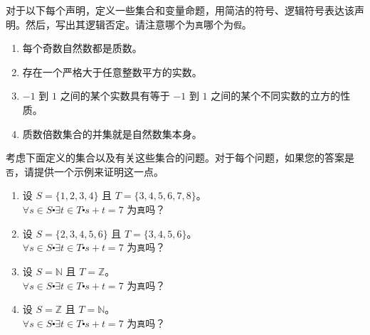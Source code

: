 \begin{exercise}
    对于以下每个声明，定义一些集合和变量命题，用简洁的符号、逻辑符号表达该声明。然后，写出其逻辑否定。请注意哪个为\verb|真|哪个为\verb|假|。

    \begin{enumerate}[label=(\alph*)]
        \item 每个奇数自然数都是质数。
        \item 存在一个严格大于任意整数平方的实数。
        \item $-1$ 到 $1$ 之间的某个实数具有等于 $-1$ 到 $1$ 之间的某个不同实数的立方的性质。
        \item 质数倍数集合的并集就是自然数集本身。
    \end{enumerate}  
\end{exercise}

\begin{exercise}
    考虑下面定义的集合以及有关这些集合的问题。对于每个问题，如果您的答案是\verb|否|，请提供一个示例来证明这一点。

    \begin{enumerate}[label=(\alph*)]
        \item 设 $S = \{1, 2, 3, 4\}$ 且 $T = \{3, 4, 5, 6, 7, 8\}$。\\
            $\forall s \in S \centerdot \exists t \in T \centerdot s + t = 7$ 为\verb|真|吗？
        \item 设 $S = \{2, 3, 4, 5, 6\}$ 且 $T = \{3, 4, 5, 6\}$。\\
            $\forall s \in S \centerdot \exists t \in T \centerdot s + t = 7$ 为\verb|真|吗？
        \item 设 $S = \mathbb{N}$ 且 $T = \mathbb{Z}$。\\
            $\forall s \in S \centerdot \exists t \in T \centerdot s + t = 7$ 为\verb|真|吗？
        \item 设 $S = \mathbb{Z}$ 且 $T = \mathbb{N}$。\\
            $\forall s \in S \centerdot \exists t \in T \centerdot s + t = 7$ 为\verb|真|吗？
    \end{enumerate}  
\end{exercise}

